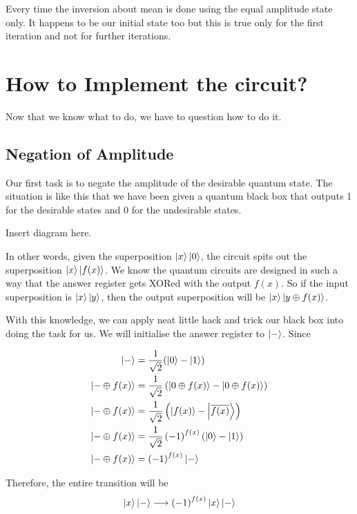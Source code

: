 \documentclass[13pt]{article}
\begin{document}
Every time the inversion about mean is done using the equal amplitude state only. It happens to be our initial state too but this is true only for the first iteration and not for further iterations.

\section{How to Implement the circuit?}

Now that we know what to do, we have to question how to do it.
\subsection{Negation of Amplitude}
Our first task is to negate the amplitude of the desirable quantum state.
The situation is like this that we have been given a quantum black box that outputs 1 for the desirable states and 0 for the undesirable states.

Insert diagram here.

In other words, given the superposition $\ket{x}\ket{0}$, the circuit spits out the superposition $\ket{x}\ket{f(x)}$. We know the quantum circuits are designed in such a way that the answer register gets XORed with the output $f(x)$. So if the input superposition is $\ket{x}\ket{y}$, then the output superposition will be $\ket{x}\ket{y \oplus{f(x)}}$.

With this knowledge, we can apply neat little hack and trick our black box into doing the task for us. We will initialise the answer register to $\ket{-}$. Since

\begin{align*}
\ket{-} &= \dfrac{1}{\sqrt{2}} ( \ket{0} - \ket{1} )\\
\ket{- \oplus {f(x)}} &= \dfrac{1}{\sqrt{2}} \left( \ket{0 \oplus {f(x)}} - \ket{0 \oplus {f(x)}} \right)\\
\ket{- \oplus {f(x)}} &= \dfrac{1}{\sqrt{2}} \left( \ket{{f(x)}} - \ket{\overline{f(x)}} \right)\\
\ket{- \oplus {f(x)}} &= \dfrac{1}{\sqrt{2}} \left( -1 \right) ^ {f(x)} \left( \ket{0} - \ket{1} \right)\\
\ket{- \oplus {f(x)}} &= \left( -1 \right) ^ {f(x)} \ket{-}\\
\end{align*}

Therefore, the entire transition will be
$$\ket{x}\ket{-} \longrightarrow \left( -1 \right) ^ {f(x)} \ket{x} \ket{-}$$
\end{document}
